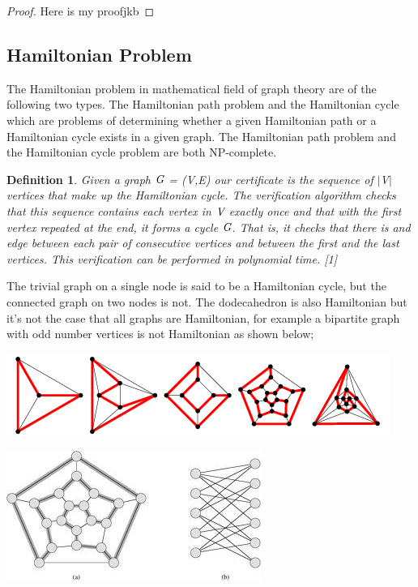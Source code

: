 \documentclass[a4paper]{report}
\newtheorem{defi}{Definition}
\newtheorem{proof}{Proof}
\begin{document}
\vspace{3mm}



\begin{proof}
Here is my proofjkb  
\end{proof}

\subsection{Hamiltonian Problem}
The Hamiltonian problem in mathematical field of graph theory are of the following two types. The Hamiltonian path problem and the Hamiltonian cycle which are problems of determining whether a given Hamiltonian path or a Hamiltonian cycle exists in a given graph. The Hamiltonian path problem and the Hamiltonian cycle problem are both NP-complete. 


\begin{defi}
Given a graph $\emph{G}$ = (V,E) our certificate is the sequence of $\vert$V$\vert$ vertices that make up the Hamiltonian cycle. The verification algorithm checks that this sequence contains each vertex in $\emph{V}$ exactly once and that with the first vertex repeated at the end, it forms a cycle $\emph{G}$. That is, it checks that there is and edge between each pair of consecutive vertices and between the first and the last vertices. This verification can be performed in polynomial time. [1]
\end{defi}

\vspace{3mm}

The trivial graph on a single node is said to be a Hamiltonian cycle, but the connected graph on two nodes is not. The dodecahedron is also Hamiltonian but it's not the case that all graphs are Hamiltonian, for example a bipartite graph with odd number vertices is not Hamiltonian as shown below; 


\begin{center}
\includegraphics[scale=0.80]{Hamiltonian1.png}
\end{center}

\begin{center}
\includegraphics[scale=0.75]{bipartite.png}
\end{center}
\end{document}
